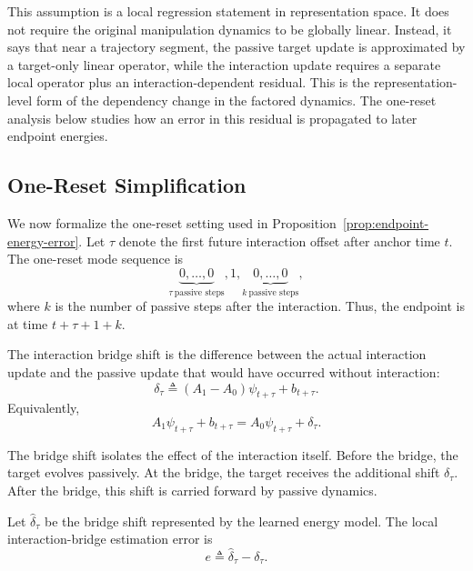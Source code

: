 This assumption is a local regression statement in representation space.
It does not require the original manipulation dynamics to be globally linear.
Instead, it says that near a trajectory segment, the passive target update is approximated by a target-only linear operator, while the interaction update requires a separate local operator plus an interaction-dependent residual.
This is the representation-level form of the dependency change in the factored dynamics.
The one-reset analysis below studies how an error in this residual is propagated to later endpoint energies.

\subsection{One-Reset Simplification}

We now formalize the one-reset setting used in Proposition~\ref{prop:endpoint-energy-error}.
Let $\tau$ denote the first future interaction offset after anchor time $t$.
The one-reset mode sequence is
\[
    \underbrace{0,\ldots,0}_{\tau\ \text{passive steps}},
    1,
    \underbrace{0,\ldots,0}_{k\ \text{passive steps}},
\]
where $k$ is the number of passive steps after the interaction.
Thus, the endpoint is at time $t+\tau+1+k$.

\begin{definition}
\label{def:bridge-shift}
The interaction bridge shift is the difference between the actual interaction update and the passive
update that would have occurred without interaction:
\begin{equation}
    \delta_\tau
    \triangleq
    (A_1-A_0)\psi_{t+\tau}+b_{t+\tau}.
    \label{eq:bridge-shift-appendix}
\end{equation}
Equivalently,
\begin{equation}
    A_1\psi_{t+\tau}+b_{t+\tau}
    =
    A_0\psi_{t+\tau}
    +
    \delta_\tau .
    \label{eq:bridge-as-passive-plus-shift}
\end{equation}
\end{definition}

The bridge shift isolates the effect of the interaction itself.
Before the bridge, the target evolves passively.
At the bridge, the target receives the additional shift $\delta_\tau$.
After the bridge, this shift is carried forward by passive dynamics.

\begin{definition}
\label{def:bridge-error}
Let $\widehat{\delta}_\tau$ be the bridge shift represented by the learned energy model.
The local interaction-bridge estimation error is
\begin{equation}
    e
    \triangleq
    \widehat{\delta}_\tau-\delta_\tau .
    \label{eq:bridge-error-appendix}
\end{equation}
\end{definition}

